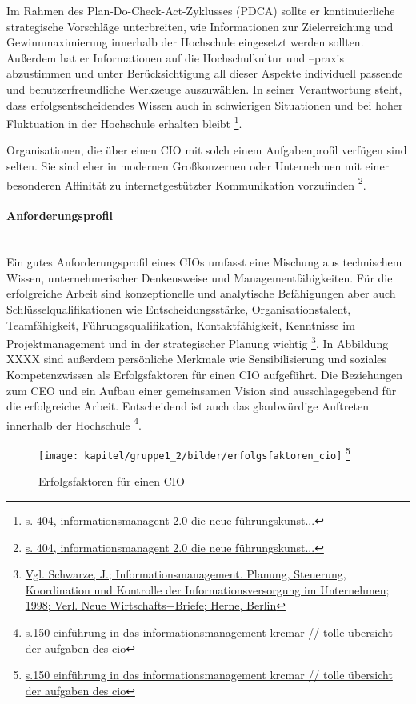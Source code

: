 Im Rahmen des Plan-Do-Check-Act-Zyklusses (PDCA) sollte er kontinuierliche strategische Vorschläge unterbreiten, wie Informationen zur Zielerreichung und Gewinnmaximierung innerhalb der Hochschule eingesetzt werden sollten. Außerdem hat er Informationen auf die Hochschulkultur und –praxis  abzustimmen und unter Berücksichtigung all dieser Aspekte individuell passende und benutzerfreundliche Werkzeuge auszuwählen. In seiner Verantwortung steht, dass erfolgsentscheidendes Wissen auch in schwierigen Situationen und bei hoher Fluktuation in der Hochschule erhalten bleibt \footnote{\url{s. 404, informationsmanagent 2.0 die neue führungskunst...}}.

Organisationen, die über einen CIO mit solch einem Aufgabenprofil verfügen sind selten. Sie sind eher in modernen Großkonzernen oder Unternehmen mit einer besonderen Affinität zu internetgestützter Kommunikation vorzufinden \footnote{\url{s. 404, informationsmanagent 2.0 die neue führungskunst...}}. 


\paragraph{Anforderungsprofil}\mbox{}\\
Ein gutes Anforderungsprofil eines CIOs umfasst eine Mischung aus technischem Wissen, unternehmerischer Denkensweise und Managementfähigkeiten. Für die erfolgreiche Arbeit sind konzeptionelle und analytische Befähigungen aber auch Schlüsselqualifikationen wie Entscheidungsstärke, Organisationstalent, Teamfähigkeit, Führungsqualifikation, Kontaktfähigkeit, Kenntnisse im Projektmanagement und  in der strategischer Planung wichtig \footnote{\url{Vgl. Schwarze, J.; Informationsmanagement. Planung, Steuerung, Koordination und Kontrolle der Informationsversorgung im Unternehmen; 1998; Verl. Neue Wirtschafts−Briefe; Herne, Berlin}}. 
In Abbildung XXXX sind außerdem persönliche Merkmale wie Sensibilisierung und soziales Kompetenzwissen als Erfolgsfaktoren für einen CIO aufgeführt. Die Beziehungen zum CEO und ein Aufbau einer gemeinsamen Vision sind ausschlagegebend für die erfolgreiche Arbeit. Entscheidend ist auch das glaubwürdige Auftreten innerhalb der Hochschule \footnote{\url{s.150 einführung in das informationsmanagement krcmar // tolle übersicht der aufgaben des cio}}.

\begin{figure}[h!]
	\centering
	\texttt{[image: kapitel/gruppe1\_2/bilder/erfolgsfaktoren\_cio]} 
	\footnote{\url{s.150 einführung in das informationsmanagement krcmar // tolle übersicht der aufgaben des cio}}
	\caption{Erfolgsfaktoren für einen CIO}
	\label{efec}
\end{figure}

